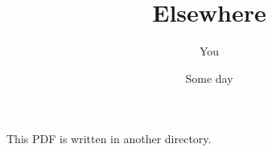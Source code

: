 \documentclass{article}
\title{Elsewhere}
\author{You}
\date{Some day}
\begin{document}
    \maketitle

    This PDF is written in another directory.
\end{document}
